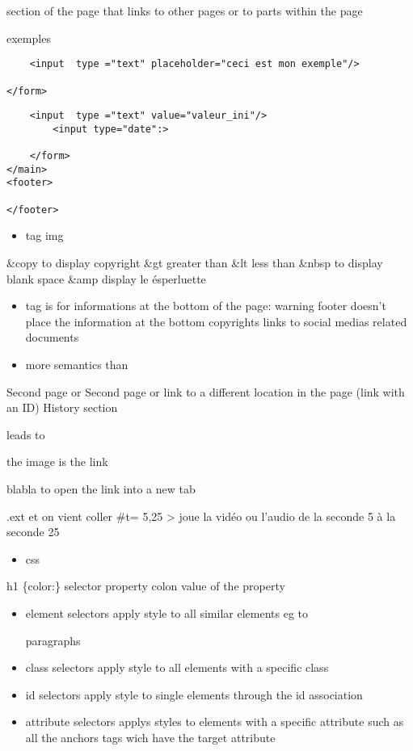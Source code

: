 \documentclass[
]{book}
\providecommand{\tightlist}{%
  \setlength{\itemsep}{0pt}\setlength{\parskip}{0pt}}
\begin{document}
section of the page that links to other pages or to parts within the page

exemples

\begin{verbatim}
    <input  type ="text" placeholder="ceci est mon exemple"/>

</form>
\end{verbatim}

\begin{verbatim}
    <input  type ="text" value="valeur_ini"/>
        <input type="date":>

    </form>
</main>
<footer>

</footer>
\end{verbatim}

\begin{itemize}
\tightlist
\item
  tag img
\end{itemize}

\&copy to display copyright
\&gt greater than
\&lt less than
\&nbsp to display blank space
\&amp display le ésperluette

\begin{itemize}
\item
  tag is for informations at the bottom of the page:
  warning footer doesn't place the information at the bottom
  copyrights
  links to social medias
  related documents
\item
  more semantics than
\end{itemize}

Second page
or Second page
or link to a different location in the page (link with an ID)
History section

leads to

\hypertarget{history}{}

the image is the link

blabla to open the link into a new tab

.ext et on vient coller \#t= 5,25 \textgreater{} joue la vidéo ou l'audio de la seconde 5 à la seconde 25

\begin{itemize}
\tightlist
\item
  css
\end{itemize}

h1 \{color:\}
selector property colon value of the property

\begin{itemize}
\item
  element selectors
  apply style to all similar elements
  eg to

  paragraphs
\item
  class selectors
  apply style to all elements with a specific class
\item
  id selectors
  apply style to single elements through the id association
\item
  attribute selectors
  applys styles to elements with a specific attribute
  such as all the anchors tags wich have the target attribute
\end{itemize}
\end{document}
